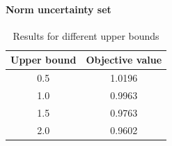 \paragraph*{Norm uncertainty set}
\begin{table}
    \centering
    \begin{tabular}{|c|c|}
        Upper bound & Objective value \\ \hline
        0.5         & 1.0196          \\
        1.0         & 0.9963          \\
        1.5         & 0.9763          \\
        2.0         & 0.9602          \\
        \hline
    \end{tabular}
    \caption{Results for different upper bounds}
\end{table}

